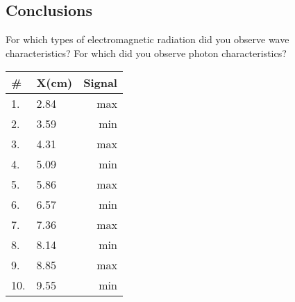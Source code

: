 \begin{multicols}{2}
\section{Conclusions}
  For which types of electromagnetic radiation did you observe wave characteristics?  For which did you observe photon characteristics?\\

\begin{center}
\begin{tabularx}{0.8\linewidth}{@{}XXr@{}}
	\hline
	\# & X(cm) & Signal\\
	\hline
1.	&	2.84 &	max\\
2.	&	3.59 &	min\\
3.	&	4.31 &	max	\\
4.	&	5.09 &	min\\
5.	&	5.86 &	max\\
6.	&	6.57 &	min\\
7.	&	7.36 &	max\\
8.	&	8.14 &	min\\
9.	&	8.85 &	max\\
10.	& 	9.55 &	min\\
\end{tabularx}
 \label{t:microwavesignal}
\end{center}


\end{multicols}

